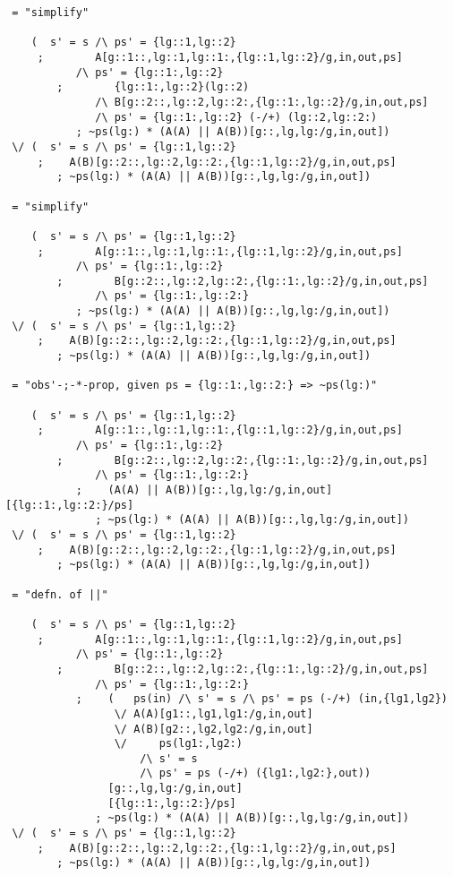 \begin{verbatim}
 = "simplify"

    (  s' = s /\ ps' = {lg::1,lg::2}
     ;        A[g::1::,lg::1,lg::1:,{lg::1,lg::2}/g,in,out,ps]
           /\ ps' = {lg::1:,lg::2}
        ;        {lg::1:,lg::2}(lg::2)
              /\ B[g::2::,lg::2,lg::2:,{lg::1:,lg::2}/g,in,out,ps]
              /\ ps' = {lg::1:,lg::2} (-/+) (lg::2,lg::2:)
           ; ~ps(lg:) * (A(A) || A(B))[g::,lg,lg:/g,in,out])
 \/ (  s' = s /\ ps' = {lg::1,lg::2}
     ;    A(B)[g::2::,lg::2,lg::2:,{lg::1,lg::2}/g,in,out,ps]
        ; ~ps(lg:) * (A(A) || A(B))[g::,lg,lg:/g,in,out])

 = "simplify"

    (  s' = s /\ ps' = {lg::1,lg::2}
     ;        A[g::1::,lg::1,lg::1:,{lg::1,lg::2}/g,in,out,ps]
           /\ ps' = {lg::1:,lg::2}
        ;        B[g::2::,lg::2,lg::2:,{lg::1:,lg::2}/g,in,out,ps]
              /\ ps' = {lg::1:,lg::2:}
           ; ~ps(lg:) * (A(A) || A(B))[g::,lg,lg:/g,in,out])
 \/ (  s' = s /\ ps' = {lg::1,lg::2}
     ;    A(B)[g::2::,lg::2,lg::2:,{lg::1,lg::2}/g,in,out,ps]
        ; ~ps(lg:) * (A(A) || A(B))[g::,lg,lg:/g,in,out])

 = "obs'-;-*-prop, given ps = {lg::1:,lg::2:} => ~ps(lg:)"

    (  s' = s /\ ps' = {lg::1,lg::2}
     ;        A[g::1::,lg::1,lg::1:,{lg::1,lg::2}/g,in,out,ps]
           /\ ps' = {lg::1:,lg::2}
        ;        B[g::2::,lg::2,lg::2:,{lg::1:,lg::2}/g,in,out,ps]
              /\ ps' = {lg::1:,lg::2:}
           ;    (A(A) || A(B))[g::,lg,lg:/g,in,out][{lg::1:,lg::2:}/ps]
              ; ~ps(lg:) * (A(A) || A(B))[g::,lg,lg:/g,in,out])
 \/ (  s' = s /\ ps' = {lg::1,lg::2}
     ;    A(B)[g::2::,lg::2,lg::2:,{lg::1,lg::2}/g,in,out,ps]
        ; ~ps(lg:) * (A(A) || A(B))[g::,lg,lg:/g,in,out])

 = "defn. of ||"

    (  s' = s /\ ps' = {lg::1,lg::2}
     ;        A[g::1::,lg::1,lg::1:,{lg::1,lg::2}/g,in,out,ps]
           /\ ps' = {lg::1:,lg::2}
        ;        B[g::2::,lg::2,lg::2:,{lg::1:,lg::2}/g,in,out,ps]
              /\ ps' = {lg::1:,lg::2:}
           ;    (   ps(in) /\ s' = s /\ ps' = ps (-/+) (in,{lg1,lg2})
                 \/ A(A)[g1::,lg1,lg1:/g,in,out]
                 \/ A(B)[g2::,lg2,lg2:/g,in,out]
                 \/     ps(lg1:,lg2:)
                     /\ s' = s
                     /\ ps' = ps (-/+) ({lg1:,lg2:},out))
                [g::,lg,lg:/g,in,out]
                [{lg::1:,lg::2:}/ps]
              ; ~ps(lg:) * (A(A) || A(B))[g::,lg,lg:/g,in,out])
 \/ (  s' = s /\ ps' = {lg::1,lg::2}
     ;    A(B)[g::2::,lg::2,lg::2:,{lg::1,lg::2}/g,in,out,ps]
        ; ~ps(lg:) * (A(A) || A(B))[g::,lg,lg:/g,in,out])


\end{verbatim}
